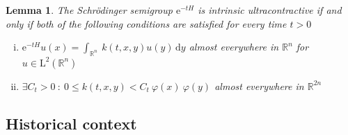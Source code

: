 \documentclass[12pt,longbibliography]{article}
\def\R{\mathbb{R}}
\def\d{\,\mathrm{d}}
\newtheorem{lem}[thm]{Lemma}
\theoremstyle{definition}
\theoremstyle{remark}
\theoremstyle{example}
\begin{document}
\begin{lem} The Schrödinger semigroup $\mathrm{e}^{-tH}$ is intrinsic ultracontractive if and only if both of the following 
conditions are satisfied for every time $t > 0$
\begin{enumerate}[i)]
\item $\mathrm{e}^{-tH}u (x) = \int_{\R^{n}} \ k(t,x,y) u(y) \d y$ almost everywhere in $\R^{n}$ for 
$u \in \mathrm{L}^{2}(\R^{n})$ 
\item $\exists C_{t} > 0 \ : \ 0 \leq k(t,x,y) < C_{t} \ \varphi(x) \ \varphi(y)$ almost everywhere in $\R^{2n}$\\
\end{enumerate}
\end{lem}



\subsection{Historical context}
\end{document}

